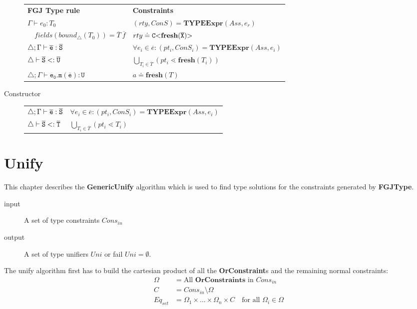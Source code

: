 \documentclass[runningheads]{llncs}
\begin{document}
\begin{description}
 \begin{tabular}{l|l}
   \textbf{FGJ Type rule} & \textbf{Constraints} \\
   $\Gamma \vdash e_0:T_0$ & $(rty, ConS) = \textbf{TYPEExpr}(Ass, e_r)$\\ 
   $\quad \mathit{fields}(\mathit{bound}_\triangle(T_0)) = \overline{T} \ \overline{f}$ & $rty \doteq \mathtt{C {\tt <} \textbf{fresh}(\overline{\tt X}) {\tt >} \ }$ \\
  $\triangle; \Gamma \vdash \overline{\tt e} : \overline{\tt S}$ & $\forall e_i \in \overline{e} : (pt_i, ConS_i) = \textbf{TYPEExpr}(Ass, e_i)$\\
  $\triangle \vdash \overline{\tt S} <: \overline{\tt U}$ & $ \bigcup_{T_i \in \overline{T}} (pt_i \lessdot \textbf{fresh}(T_i))$\\
  $\triangle; \Gamma \vdash \mathtt{e_0.m(\overline{e}) : U }$ & $a \doteq \textbf{fresh}(T)$ \\
 \end{tabular}
 \item[Constructor]

\begin{tabular}{l|l}
  $\triangle; \Gamma \vdash \overline{\tt e} : \overline{\tt S}$ & $\forall e_i \in \overline{e} : (pt_i, ConS_i) = \textbf{TYPEExpr}(Ass, e_i)$\\
  $\triangle \vdash \overline{\tt S} <: \overline{\tt T}$ & $\bigcup_{T_i \in \overline{T}} (pt_i \lessdot T_i)$
\end{tabular}
  
\end{description}

\section{Unify}
\label{sec:unify}
This chapter describes the \textbf{GenericUnify} algorithm
which is used to find type solutions for the constraints generated by \textbf{FGJType}.

\begin{description}
\item[input] A set of type constraints $Cons_{in}$ %
\item[output] A set of type unifiers $Uni$
or fail $Uni = \emptyset$.
\end{description}

The unify algorithm first has to build the cartesian product of all the \textbf{OrConstraint}s and the remaining normal constraints:
\begin{align*}
\Omega &= \text{All }\mathbf{OrConstraints} \text{ in } {Cons}_{in}\\
C &= {Cons}_{in} \setminus \Omega \\
Eq_{set} &= \Omega_1 \times \ldots \times \Omega_n \times C \quad \text{for all }\Omega_i \in \Omega
\end{align*}
\end{document}
